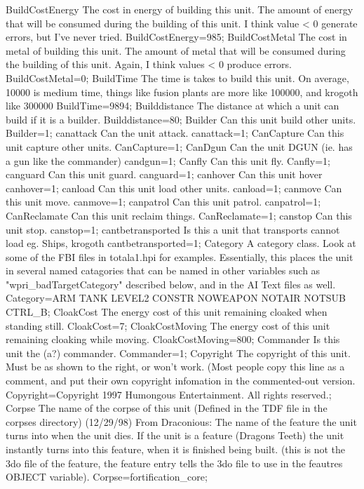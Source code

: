 \documentclass[a4paper,10pt]{article}
\begin{document}
BuildCostEnergy 	The cost in energy of building this unit.  The amount of energy that will be consumed during the building of this unit. I think value < 0 generate errors, but I've never tried.   	BuildCostEnergy=985;
BuildCostMetal 	The cost in metal of building this unit.  The amount of metal that will be consumed during the building of this unit. Again, I think values < 0 produce errors.   	BuildCostMetal=0;
BuildTime 	The time is takes to build this unit. On average, 10000 is medium time, things like fusion plants are more like 100000, and krogoth like 300000 	BuildTime=9894;
Builddistance 	The distance at which a unit can build if it is a builder. 	Builddistance=80;
Builder 	Can this unit build other units. 	Builder=1;
canattack 	Can the unit attack. 	canattack=1;
CanCapture 	Can this unit capture other units. 	CanCapture=1;
CanDgun 	Can the unit DGUN (ie. has a gun like the commander) 	candgun=1;
Canfly 	Can this unit fly. 	Canfly=1;
canguard 	Can this unit guard. 	canguard=1;
canhover 	Can this unit hover 	canhover=1;
canload 	Can this unit load other units. 	canload=1;
canmove 	Can this unit move. 	canmove=1;
canpatrol 	Can this unit patrol. 	canpatrol=1;
CanReclamate 	Can this unit reclaim things. 	CanReclamate=1;
canstop 	Can this unit stop. 	canstop=1;
cantbetransported 	Is this a unit that transports cannot load eg. Ships, krogoth 	cantbetransported=1;
Category 	A category class. Look at some of the FBI files in totala1.hpi for examples.  Essentially, this places the unit in several named catagories that can be named in other variables such as "wpri\_badTargetCategory" described below, and in the AI Text files as well. 	Category=ARM TANK LEVEL2 CONSTR NOWEAPON NOTAIR NOTSUB CTRL\_B;
CloakCost 	The energy cost of this unit remaining cloaked when standing still. 	CloakCost=7;
CloakCostMoving 	The energy cost of this unit remaining cloaking while moving. 	CloakCostMoving=800;
Commander 	Is this unit the (a?) commander. 	Commander=1;
Copyright 	The copyright of this unit. Must be as shown to the right, or won't work.  (Most people copy this line as a comment, and put their own copyright infomation in the commented-out version. 	Copyright=Copyright 1997 Humongous Entertainment. All rights reserved.;
Corpse 	The name of the corpse of this unit (Defined in the TDF file in the corpses directory)  (12/29/98)  From Draconious:  The name of the feature the unit turns into when the unit dies. If the unit is a feature (Dragons Teeth) the unit instantly turns into this feature, when it is finished being built. (this is not the 3do file of the feature, the feature entry tells the 3do file to use in the feautres OBJECT variable). 	Corpse=fortification\_core;
\end{document}
